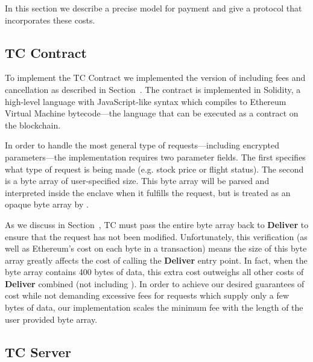 In this section we describe a precise model for payment and give a protocol that incorporates these costs.







\subsection{TC Contract}

To implement the TC Contract we implemented the version of \tcont including fees and cancellation as described in Section~.
The contract is implemented in Solidity, a high-level language with JavaScript-like syntax which compiles to Ethereum Virtual Machine bytecode---the language that can be executed as a contract on the blockchain.

In order to handle the most general type of requests---including encrypted parameters---the \tcont implementation requires two parameter fields.
The first specifies what type of request is being made (e.g. stock price or flight status).
The second is a byte array of user-specified size.
This byte array will be parsed and interpreted inside the enclave when it fulfills the request, but is treated as an opaque byte array by \tcont.

As we discuss in Section~, TC must pass the entire byte array back to {\bf Deliver} to ensure that the request has not been modified.
Unfortunately, this verification (as well as Ethereum's cost on each byte in a transaction) means the size of this byte array greatly affects the cost of calling the {\bf Deliver} entry point.
In fact, when the byte array contains 400 bytes of data, this extra cost outweighs all other costs of {\bf Deliver} combined (not including \dgcallback).
In order to achieve our desired guarantees of cost while not demanding excessive fees for requests which supply only a few bytes of data,
our implementation scales the minimum fee with the length of the user provided byte array.



\subsection{TC Server}


